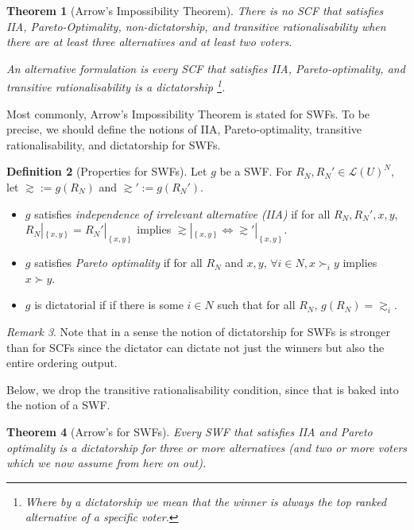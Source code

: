 \documentclass{book}
\theoremstyle{plain}
\newtheorem{theorem}{Theorem}[subsection]
\theoremstyle{definition}
\newtheorem{definition}[theorem]{Definition}
\theoremstyle{remark}
\newtheorem{remark}[theorem]{Remark}
\newcommand{\set}[1]{\left\{#1\right\}}
\begin{document}
\begin{theorem}[Arrow's Impossibility Theorem]
    There is no 
    SCF that satisfies IIA, 
    Pareto-Optimality,
    non-dictatorship, 
    and transitive 
    rationalisability
    when there are 
    at least three alternatives and at least two voters.

    An \emph{alternative formulation is}
    every SCF that satisfies IIA, Pareto-optimality,
    and transitive rationalisability is a \emph{dictatorship}
    \footnote{Where by a dictatorship we mean that the winner is always the top ranked alternative of a specific voter.}.
\end{theorem}

Most commonly, 
Arrow's Impossibility Theorem is stated for SWFs.
To be precise, 
we should define the notions of 
IIA, Pareto-optimality, transitive rationalisability, and dictatorship for SWFs.

\begin{definition}[Properties for SWFs]
    Let $g$ be a SWF.
    For $R_N, R_N' \in \mathcal{L}(U)^N$, 
    let $\gtrsim := g(R_N)$ and $\gtrsim' := g(R_N')$.
    \begin{itemize}
        \item $g$ satisfies \emph{independence of 
        irrelevant alternative (IIA)} if 
        for all $R_N, R_N', x, y$, 
        $R_N|_{\set{x, y}} = R_N'|_{\set{x, y}}$ implies $\gtrsim|_{\set{x, y}} \iff \gtrsim'|_{\set{x, y}}$.

        \item $g$ satisfies \emph{Pareto optimality} if for all $R_N$ and $x, y$,
        $\forall i \in N, x \succ_i y$ implies $x \succ y$.

        \item $g$ is dictatorial if 
        if there is some $i \in N$ such that for all $R_N$, $g(R_N) = \gtrsim_i$.
    \end{itemize}
\end{definition}

\begin{remark}
    Note that in a sense the notion of 
    dictatorship for SWFs is stronger than for SCFs since 
    the dictator can dictate not just the winners but also the 
    entire ordering output.
\end{remark}

Below, we drop the 
transitive rationalisability condition,
since that is baked into the 
notion of a SWF.
\begin{theorem}[Arrow's for SWFs]
    Every SWF that satisfies IIA and Pareto optimality is a dictatorship
    for three or more alternatives (and two or more voters which we now assume
    from here on out).
\end{theorem}
\end{document}
